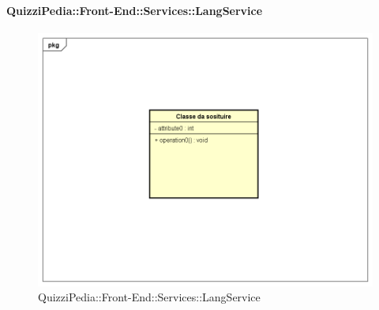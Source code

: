 \paragraph{QuizziPedia::Front-End::Services::LangService}
\begin{figure}
	\centering
	\includegraphics[scale=0.45]{UML/Classi/Front-End/Temporanea.png}
	\caption{QuizziPedia::Front-End::Services::LangService}
\end{figure}
